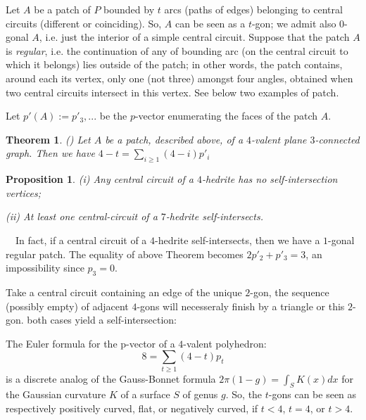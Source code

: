 \documentclass[12pt]{article}
\newtheorem{proposition}{Proposition}
\newtheorem{theor}{Theorem}
\newcommand{\proof}{\noindent{\bf Proof.}\ \ }
\begin{document}
Let $A$ be a patch of $P$ bounded by $t$ arcs (paths of edges) belonging to 
central circuits (different or coinciding). So, $A$ can be seen as a 
$t$-gon; we admit also $0$-gonal $A$, i.e.
just the interior of a simple central circuit. Suppose that the patch $A$ is
{\em regular}, i.e.
the continuation of any of bounding arc (on the central circuit to which it
belongs) lies outside of the patch; in other words, the patch
contains, around each its vertex, only one (not three) amongst four angles, 
obtained when two central circuits intersect in this vertex.  See below two 
examples of patch.

\begin{center}
\epsfxsize=60mm
\end{center}

Let $p'(A):=p'_3,...$ be the $p$-vector enumerating the faces of the patch $A$. 

\begin{theor} \label{Local-Euler-Formula}(\cite{DSt})
Let $A$ be a patch, described above, of a $4$-valent plane $3$-connected 
graph. Then we have $4-t=\sum_{i\geq 1} (4-i)p'_i$
\end{theor}



\begin{proposition}
(i) Any central circuit of a $4$-hedrite has no self-intersection vertices;

(ii) At least one central-circuit of a $7$-hedrite self-intersects.
\end{proposition}
\proof In fact, if a central circuit of a $4$-hedrite self-intersects, then we have a $1$-gonal regular patch. The equality of above Theorem becomes $2p'_2+p'_3=3$, an impossibility since $p_3=0$.

Take a central circuit containing an edge of the unique $2$-gon, the sequence (possibly empty) of adjacent $4$-gons will necesseraly finish by a triangle or this $2$-gon. both cases yield a self-intersection:

\begin{center}
\epsfxsize=60mm
\end{center}





The Euler formula for the p-vector of a $4$-valent polyhedron:
$$8=\sum_{t\geq 1} (4-t)p_t$$
is a discrete analog of the Gauss-Bonnet formula $2\pi(1-g)=\int_{S} K(x)dx$ for the Gaussian curvature $K$ of a surface $S$ of genus $g$. So, the $t$-gons can be seen as respectively positively curved, flat, or negatively curved, if $t<4$, $t=4$, or $t>4$.
\end{document}
